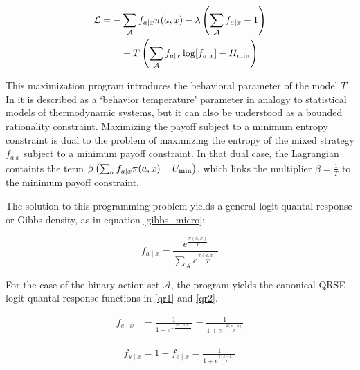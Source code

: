 \begin{equation} \label{lag1}
\begin{aligned}
\mathcal{L}=-& \sum_{\mathcal{A}} f_{a \mid x} \space
\pi(a,x)-\lambda\left(\sum_{\mathcal{A}} f_{a \mid x}-1\right)
\\ &+T\left(\sum_{\mathcal{A}} f_{a \mid x} \log [f_{a \mid x}]-H_{\min }\right)
\end{aligned} 
\end{equation}

\medskip

\medskip 

This maximization program introduces the behavioral parameter of the
model $T$. In \citet{schafol} it is described as a `behavior
temperature' parameter in analogy to statistical models of
thermodynamic systems, but it can also be understood as a bounded
rationality constraint.  Maximizing the payoff subject to a minimum
entropy constraint is dual to the problem of maximizing the entropy of
the mixed strategy $f_{a|x}$ subject to a minimum payoff
constraint. In that dual case, the Lagrangian containts the term
$\beta\left(\sum_{a} f_{a \mid x} \space
\pi(a,x)-U_{\operatorname{min}}\right)$, which links the multiplier
$\beta=\frac{1}{T}$ to the minimum payoff constraint.  

The solution to this programming problem yields a general logit
quantal response or Gibbs density, as in equation \ref{gibbs_micro}:

\begin{equation} \label{gibbs_micro}
f_{a \mid x}=\frac{e^{\frac{\pi(a, x)}{T}}}{\sum_{\mathcal{A}} e^{\frac{\pi(a, x)}{T}}}
\end{equation}

\medskip 

For the case of the binary action set $\mathcal{A}$, the program
yields the canonical QRSE logit quantal response functions in \ref{qr1}
and \ref{qr2}. 

\medskip

\begin{equation} \label{qr1}
\begin{aligned}
f_{e \mid x} &= \frac{1}{1+e^{-\frac{\Delta \mathrm{\pi}(a, x)}{T}}}  = 
\frac{1}{1+e^{-\frac{2(x-\mu)}{T}}}
\end{aligned}
\end{equation}


\begin{equation} \label{qr2}
\begin{aligned}
f_{s \mid x}=1-f_{e \mid x} = \frac{1}{1+e^{\frac{2(x-\mu)}{T}}}
\end{aligned}
\end{equation}

